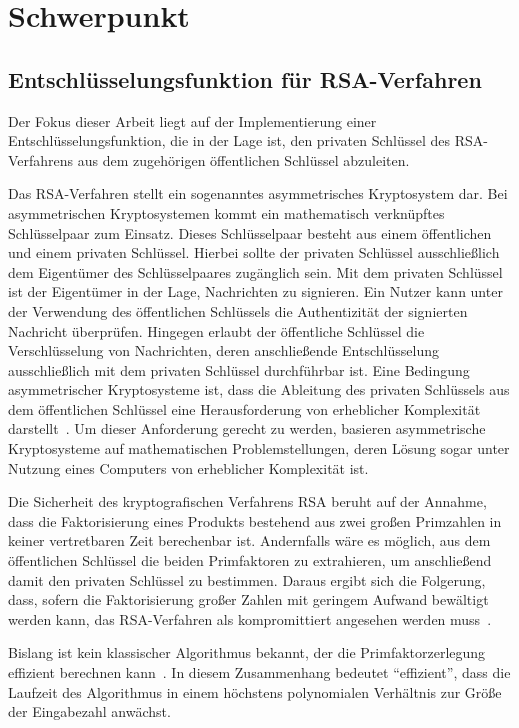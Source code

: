 \section{Schwerpunkt}
\subsection{Entschlüsselungsfunktion für RSA-Verfahren} 
Der Fokus dieser Arbeit liegt auf der Implementierung einer Entschlüsselungsfunktion, die in der Lage ist, 
den privaten Schlüssel des RSA-Verfahrens aus dem zugehörigen öffentlichen Schlüssel abzuleiten.

Das RSA-Verfahren stellt ein sogenanntes asymmetrisches Kryptosystem dar.
Bei asymmetrischen Kryptosystemen kommt ein mathematisch verknüpftes Schlüsselpaar zum Einsatz. 
Dieses Schlüsselpaar besteht aus einem öffentlichen und einem privaten Schlüssel.
Hierbei sollte der privaten Schlüssel ausschließlich dem Eigentümer des Schlüsselpaares zugänglich sein.
Mit dem privaten Schlüssel ist der Eigentümer in der Lage, Nachrichten zu signieren. 
Ein Nutzer kann unter der Verwendung des öffentlichen Schlüssels die Authentizität der signierten Nachricht überprüfen. 
Hingegen erlaubt der öffentliche Schlüssel die Verschlüsselung von Nachrichten, 
deren anschließende Entschlüsselung ausschließlich mit dem privaten Schlüssel durchführbar ist.
Eine Bedingung asymmetrischer Kryptosysteme ist, 
dass die Ableitung des privaten Schlüssels aus dem öffentlichen Schlüssel eine Herausforderung von erheblicher Komplexität darstellt~\cite{1055638}. 
Um dieser Anforderung gerecht zu werden, basieren asymmetrische Kryptosysteme auf mathematischen Problemstellungen, 
deren Lösung sogar unter Nutzung eines Computers von erheblicher Komplexität ist.

Die Sicherheit des kryptografischen Verfahrens RSA beruht auf der Annahme,
dass die Faktorisierung eines Produkts bestehend aus zwei großen Primzahlen in keiner vertretbaren Zeit berechenbar ist.
Andernfalls wäre es möglich, aus dem öffentlichen Schlüssel die beiden Primfaktoren zu extrahieren, 
um anschließend damit den privaten Schlüssel zu bestimmen.
Daraus ergibt sich die Folgerung, dass, sofern die Faktorisierung großer Zahlen mit geringem Aufwand bewältigt werden kann, 
das RSA-Verfahren als kompromittiert angesehen werden muss~\cite{Cormen2009}.

Bislang ist kein klassischer Algorithmus bekannt, der die Primfaktorzerlegung effizient berechnen kann~\cite{Hoever2022Krypto}.
In diesem Zusammenhang bedeutet "`effizient"', dass die Laufzeit des Algorithmus in einem höchstens polynomialen Verhältnis zur Größe der Eingabezahl anwächst.

